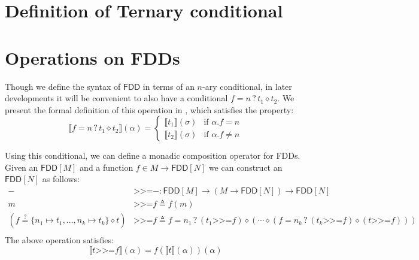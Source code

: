 \documentclass[acmsmall,dvipsnames,nonacm]{acmart}
\newcommand\bind{\mathbin{\textsf{>>=}}}
\newcommand\pk{\alpha}
\newcommand\FDD{\textsf{FDD}}
\newcommand{\fddSem}[1]{\llbracket #1 \rrbracket}
\begin{document}
\section{Definition of Ternary conditional}\label{ap:extra_fdds}
{
\newcommand{\colorTEXT}{black}
\newcommand{\colorMATH}{black}
\newcommand{\colorSYNTAX}{black}

\newcommand{\underbracketWith}[2]{\underbracket{#2}_{#1}}

\newcommand{\daraisTEXT}[1]{{\color{\colorTEXT}\textnormal{#1}}}
\newcommand{\daraisMATH}[1]{{\color{\colorMATH}\ifmmode\mathnormal{#1}\else\(\mathnormal{#1}\)\fi}}
\newcommand{\daraisSTAX}[1]{{\color{\colorSYNTAX}\textnormal{\texttt{#1}}}}

\newcommand{\daraisModeRM}[1]{\ifmmode\operatorname{\mathrm{#1}}\else\textrm{#1}\fi}
\newcommand{\daraisModeIT}[1]{\ifmmode\operatorname{\mathit{#1}}\else\textit{#1}\fi}
\newcommand{\daraisModeBF}[1]{\ifmmode\operatorname{\mathbf{#1}}\else\textbf{#1}\fi}
\newcommand{\daraisModeTT}[1]{\ifmmode\operatorname{\mathtt{#1}}\else\texttt{#1}\fi}
\newcommand{\daraisModeSC}[1]{\ifmmode\operatorname{\textsc{#1}}\else\textsc{#1}\fi}
\newcommand{\daraisModeMM}[1]{\ifmmode#1\else\(#1\)\fi}



}

\section{Operations on FDDs}\label{ap:binopfdd}

Though we define the syntax of $\FDD$ in terms of an $n$-ary
conditional, in later developments it will be convenient to also have
a conditional $f=n \mathbin ? t_1 \diamond t_2$. We present the formal
definition of this operation in , which satisfies
the property:
\[
\fddSem{f=n \mathbin ? t_1 \diamond t_2} (\pk) =
\begin{cases}
\fddSem{t_1}(\sigma)&\text{if } \pk.f = n\\
\fddSem{t_2}(\sigma)&\text{if } \pk.f \neq n
\end{cases}
\]

Using this conditional, we can define a monadic composition operator
for \FDD s. Given an $\FDD[M]$ and a function $f \in M \to \FDD[N]$
we can construct an $\FDD[N]$ as follows:
\begin{align*}
- &\bind - \colon  \FDD[M] \to (M \to \FDD[N] ) \to \FDD[N] \\
m &\bind f \triangleq f(m) \\
(f \stackrel ? = \{ n_1\mapsto t_1,\ldots, n_k\mapsto t_k\} \diamond t) &\bind f \triangleq  f=n_1 \mathbin ? (t_1 \bind f) \diamond \left(\cdots \diamond  \left(f=n_k \mathbin ? (t_k \bind f) \diamond  (t \bind f) \right)\right)\\
\end{align*}
The above operation satisfies:
\[
\fddSem{t \bind f} (\pk) = f (\fddSem{t}(\pk))(\pk)
\]
\end{document}
